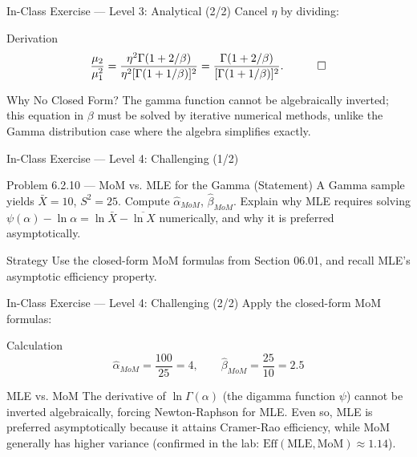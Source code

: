 \documentclass[aspectratio=169,xcolor={dvipsnames,table}]{beamer}
\begin{document}
\begin{frame}{In-Class Exercise --- Level 3: Analytical (2/2)}
	\vspace{-0.05cm}
	\scriptsize
	Cancel $\eta$ by dividing: \pause
	\begin{block}{Derivation}
		\begin{align*}
			\frac{\mu_2}{\mu_1^2} = \frac{\eta^2\Gamma(1+2/\beta)}{\eta^2[\Gamma(1+1/\beta)]^2} = \frac{\Gamma(1+2/\beta)}{[\Gamma(1+1/\beta)]^2}. \quad \qedhere
		\end{align*}
	\end{block}
	\vspace{0.05cm}
	\pause
	\begin{alertblock}{Why No Closed Form?}
		\scriptsize
		The gamma function cannot be algebraically inverted; this equation in $\beta$ must be solved by iterative numerical methods, unlike the Gamma distribution case where the algebra simplifies exactly.
	\end{alertblock}
\end{frame}

\begin{frame}{In-Class Exercise --- Level 4: Challenging (1/2)}
	\vspace{-0.1cm}
	\begin{block}{Problem 6.2.10 --- MoM vs. MLE for the Gamma (Statement)}
		A Gamma sample yields $\bar X=10$, $S^2=25$. Compute $\hat\alpha_{MoM}$, $\hat\beta_{MoM}$. Explain why MLE requires solving $\psi(\alpha)-\ln\alpha=\ln\bar X-\overline{\ln X}$ numerically, and why it is preferred asymptotically.
	\end{block}
	\vspace{0.15cm}
	\pause
	\begin{alertblock}{Strategy}
		\scriptsize
		Use the closed-form MoM formulas from Section 06.01, and recall MLE's asymptotic efficiency property.
	\end{alertblock}
\end{frame}

\begin{frame}{In-Class Exercise --- Level 4: Challenging (2/2)}
	\vspace{-0.05cm}
	\scriptsize
	Apply the closed-form MoM formulas: \pause
	\begin{block}{Calculation}
		$$\hat\alpha_{MoM} = \frac{100}{25} = 4, \qquad \hat\beta_{MoM} = \frac{25}{10} = 2.5$$
	\end{block}
	\vspace{0.05cm}
	\pause
	\begin{alertblock}{MLE vs. MoM}
		\scriptsize
		The derivative of $\ln\Gamma(\alpha)$ (the digamma function $\psi$) cannot be inverted algebraically, forcing Newton-Raphson for MLE. Even so, MLE is preferred asymptotically because it attains Cramer-Rao efficiency, while MoM generally has higher variance (confirmed in the lab: $\text{Eff}(\text{MLE},\text{MoM})\approx 1.14$).
	\end{alertblock}
\end{frame}
\end{document}

